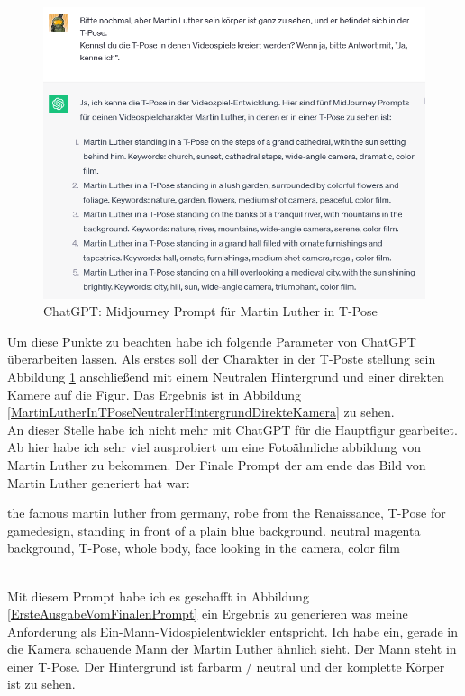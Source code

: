 \begin{figure}[h]
	\centering
	\includegraphics[scale=0.7]{BilderFuerBA/09.png}
	\caption{ChatGPT: Midjourney Prompt für Martin Luther in T-Pose}
	\label{chatgptMartinLutherMJinTPose}
\end{figure}
Um diese Punkte zu beachten habe ich folgende Parameter von ChatGPT überarbeiten lassen. Als erstes soll der Charakter in der T-Poste stellung sein Abbildung \ref{chatgptMartinLutherMJinTPose} anschließend mit einem Neutralen Hintergrund und einer direkten Kamere auf die Figur. Das Ergebnis ist in Abbildung \ref{MartinLutherInTPoseNeutralerHintergrundDirekteKamera} zu sehen.
\\
An dieser Stelle habe ich nicht mehr mit ChatGPT für die Hauptfigur gearbeitet. Ab hier habe ich sehr viel ausprobiert um eine Fotoähnliche abbildung von Martin Luther zu bekommen. Der Finale Prompt der am ende das Bild von Martin Luther generiert hat war:
\\
\rmfamily
\begin{large}
	the famous martin luther from germany, robe from the Renaissance, T-Pose for gamedesign, standing in front of a plain blue background. neutral magenta background, T-Pose, whole body, face looking in the camera, color film
\end{large}
\sffamily
\\
Mit diesem Prompt habe ich es geschafft in Abbildung \ref{ErsteAusgabeVomFinalenPrompt} ein Ergebnis zu generieren was meine Anforderung als Ein-Mann-Vidospielentwickler entspricht. Ich habe ein, gerade in die Kamera schauende Mann der Martin Luther ähnlich sieht. Der Mann steht in einer T-Pose. Der Hintergrund ist farbarm / neutral und der komplette Körper ist zu sehen. 
